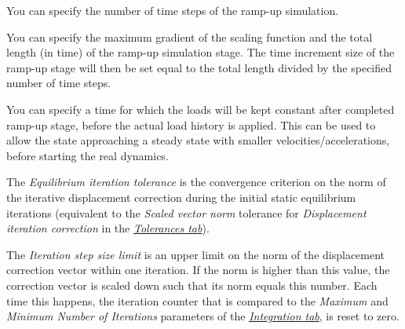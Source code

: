 
\begin{bulletlist}
  \setcounter{enumi}{4}
\item
  You can specify the number of time steps of the ramp-up simulation.
\item
  You can specify the maximum gradient of the scaling function and the
  total length (in time) of the ramp-up simulation stage. The time
  increment size of the ramp-up stage will then be set equal to the
  total length divided by the specified number of time steps.
\item
  You can specify a time for which the loads will be kept constant after
  completed ramp-up stage, before the actual load history is applied.
  This can be used to allow the state approaching a steady state with
  smaller velocities/accelerations, before starting the real dynamics.
\end{bulletlist}

\clearpage
The {\sl Equilibrium iteration tolerance} is the convergence criterion on the
norm of the iterative displacement correction during the initial static
equilibrium iterations (equivalent to the {\sl Scaled vector norm} tolerance
for {\sl Displacement iteration correction} in the
\protect\hyperlink{tolerances-tab}{\sl Tolerances tab}).

The {\sl Iteration step size limit} is an upper limit on the norm of the
displacement correction vector within one iteration. If the norm is higher than
this value, the correction vector is scaled down such that its norm equals this
number. Each time this happens, the iteration counter that is compared to the
{\sl Maximum} and {\sl Minimum Number of Iterations} parameters of the
\protect\hyperlink{integration-tab}{\sl Integration tab}, is reset to zero.



